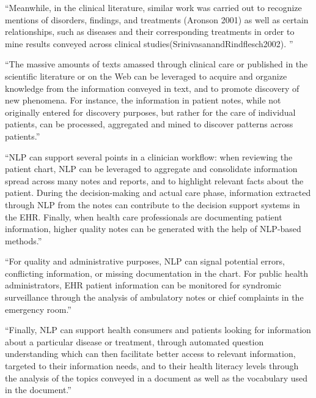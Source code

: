 

``Meanwhile, in the clinical literature, similar work was carried out to recognize mentions of disorders, findings, and treatments (Aronson 2001) as well as certain relationships, such as diseases and their corresponding treatments in order to mine results conveyed across clinical studies(SrinivasanandRindflesch2002). \cite[p.~257]{friedman_natural_2014}''


``The massive amounts of texts amassed through clinical care or published in the scientific literature or on the Web can be leveraged to acquire and organize knowledge from the information conveyed in text, and to promote discovery of new phenomena. For instance, the information in patient notes, while not originally entered for discovery purposes, but rather for the care of individual patients, can be processed, aggregated and mined to discover patterns across patients.'' \cite[p.~256]{friedman_natural_2014}

``NLP can support several points in a clinician workflow: when reviewing the patient chart, NLP can be leveraged to aggregate and consolidate information spread across many notes and reports, and to highlight relevant facts about the patient. During the decision-making and actual care phase, information extracted through NLP from the notes can contribute to the decision support systems in the EHR. Finally, when health care professionals are documenting patient information, higher quality notes can be generated with the help of NLP-based methods.'' \cite[p.~256]{friedman_natural_2014}

``For quality and administrative purposes, NLP can signal potential errors, conflicting information, or missing documentation in the chart. For public health administrators, EHR patient information can be monitored for syndromic surveillance through the analysis of ambulatory notes or chief complaints in the emergency room.'' \cite[p.~256]{friedman_natural_2014}

``Finally, NLP can support health consumers and patients looking for information about a particular disease or treatment, through automated question understanding which can then facilitate better access to relevant information, targeted to their information needs, and to their health literacy levels through the analysis of the topics conveyed in a document as well as the vocabulary used in the document.'' \cite[p.~256]{friedman_natural_2014}

